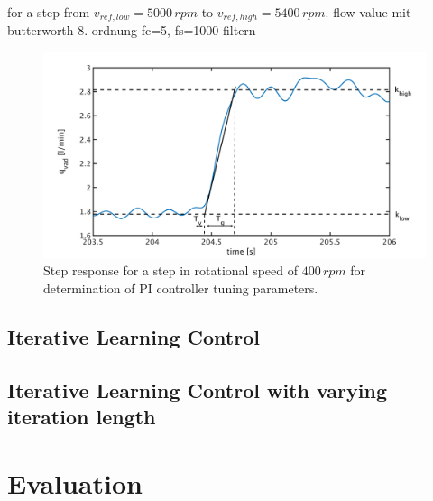 for a step from $v_{ref,low}=5000\, rpm$ to $v_{ref,high}=5400\, rpm$.
flow value mit butterworth 8. ordnung fc=5, fs=1000 filtern

\begin{figure}[ht]
  \centering
  \includegraphics[width=\textwidth]{images/chapt_5/param_calc_PI.pdf}
  \caption[Step response for determination of PI controller tuning parameters]{Step response for a step in rotational speed of $400\,rpm$ for determination of PI controller tuning parameters.}
  \label{fig:param_calc_PI}
\end{figure}

\subsection{Iterative Learning Control}

\subsection{Iterative Learning Control with varying iteration length}

\section{Evaluation}
